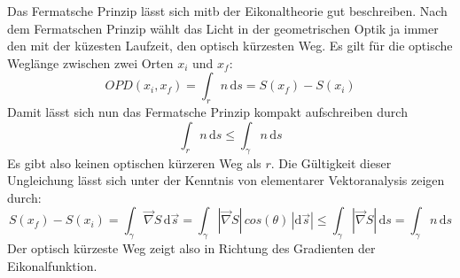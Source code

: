 \documentclass[twoside,colorback,accentcolor=tud4c,11pt]{tudreport}
\begin{document}
		Das Fermatsche Prinzip lässt sich mitb der Eikonaltheorie gut beschreiben. Nach dem Fermatschen Prinzip wählt das Licht in der geometrischen Optik ja immer den mit der küzesten Laufzeit, den optisch kürzesten Weg. Es gilt für die optische Weglänge zwischen zwei Orten $x_i$ und $x_f$:
		\[ 
		OPD\left(x_i,x_f\right) = \int_r n \,\mathrm{d}s = S\left(x_f\right) - S\left(x_i\right)
		\]
		Damit lässt sich nun das Fermatsche Prinzip kompakt aufschreiben durch
		\[
		\int_r n \,\mathrm{d}s \le \int_\gamma n \,\mathrm{d}s 
		\]
		Es gibt also keinen optischen kürzeren Weg als $r$. 
		Die Gültigkeit dieser Ungleichung lässt sich unter der Kenntnis von elementarer Vektoranalysis zeigen durch:
		\[
		S\left(x_f\right) - S\left(x_i\right) = 
		\int_\gamma \vec{\nabla} S \, \mathrm{d}\vec{s} =
		\int_\gamma |\vec{\nabla} S|\,cos\left(\theta \right)\,|\mathrm{d}\vec{s}| \le \int_\gamma |\vec{\nabla} S|\,\mathrm{d}s = \int_\gamma n \, \mathrm{d}s
		\]
		Der optisch kürzeste Weg zeigt also in Richtung des Gradienten der Eikonalfunktion.
\end{document}
